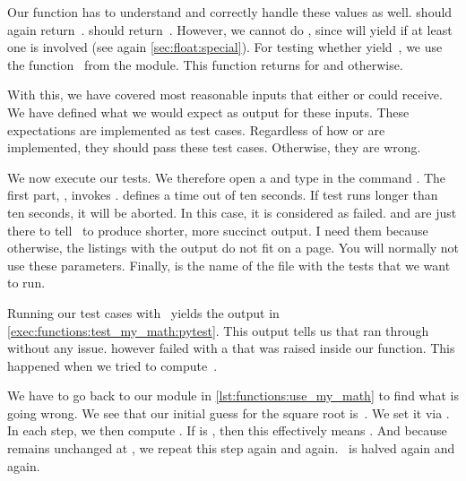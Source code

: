 Our  function has to understand and correctly handle these values as well.
 should again return~.
 should return~.
However, we cannot do , since \pythonilIdx{==} will yield  if at least one  is involved (see again \cref{sec:float:special}).
For testing whether  yield~, we use the function~ from the  module.
This function returns  for  and  otherwise.

With this, we have covered most reasonable inputs that either  or  could receive.
We have defined what we would expect as output for these inputs.
These expectations are implemented as test cases.
Regardless of how  or  are implemented, they should pass these test cases.
Otherwise, they are wrong.%
%
\begin{sloppypar}%
We now execute our tests.
We therefore open a  and type in the command .
The first part, , invokes \pytest.
 defines a time out of ten seconds.
If test runs longer than ten seconds, it will be aborted.
In this case, it is considered as failed.
 and  are just there to tell \pytest\ to produce shorter, more succinct output.
I need them because otherwise, the listings with the output do not fit on a page.
You will normally not use these parameters.
Finally,  is the name of the file with the tests that we want to run.%
\end{sloppypar}%
%
Running our test cases with \pytest\ yields the output in \cref{exec:functions:test_my_math:pytest}.
This output tells us that  ran through without any issue.
 however failed with a  that was raised inside our  function.
This happened when we tried to compute~.

We have to go back to our  module in \cref{lst:functions:use_my_math} to find what is going wrong.
We see that our initial guess for the square root is~.
We set it via .
In each step, we then compute .
If  is , then this effectively means .
And because  remains unchanged at , we repeat this step again and again.
~is halved again and again.

